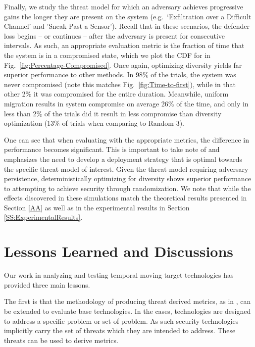 \documentclass{acm_proc_article-sp}
\begin{document}
Finally, we study the threat model for which an adversary achieves progressive gains the longer they are present on the system (e.g.\ `Exfiltration over a Difficult Channel' and 'Sneak Past a Sensor'). Recall that in these scenarios, the defender loss begins -- or continues -- after the adversary is present for  consecutive intervals. As such, an appropriate evaluation metric is the fraction of time that the system is in a compromised state, which we plot the CDF for in Fig.\ \ref{fig:Percentage-Compromised}. Once again, optimizing diversity yields far superior performance to other methods. In 98\% of the trials, the system was never compromised (note this matches Fig.\ \ref{fig:Time-to-first}), while in that other 2\% it was compromised for the entire duration. Meanwhile, uniform migration results in system compromise on average 26\% of the time, and only in less than 2\% of the trials did it result in less compromise than diversity optimization (13\% of trials when comparing to Random 3).

One can see that when evaluating with the appropriate metrics, the difference in performance becomes significant. This is important to take note of and emphasizes the need to develop a deployment strategy that is optimal towards the specific threat model of interest. Given the threat model requiring adversary persistence, deterministically optimizing for diversity shows superior performance to attempting to achieve security through randomization. We note that while the effects discovered in these simulations match the theoretical results presented in Section \ref{AA} as well as in the experimental results in Section \ref{SS:ExperimentalResults}.



\section{Lessons Learned and Discussions}
\label{LLD}

Our work in analyzing and testing temporal moving target technologies has provided three main lessons.

The first is that the methodology of producing threat derived metrics, as in \cite{lrmetrics}, can be extended to
evaluate base technologies.  In the cases, technologies are designed to address a specific problem or set of problem.
As such security technologies implicitly carry the set of threats which they are intended to address.  These threats can
be used to derive metrics.
\end{document}
